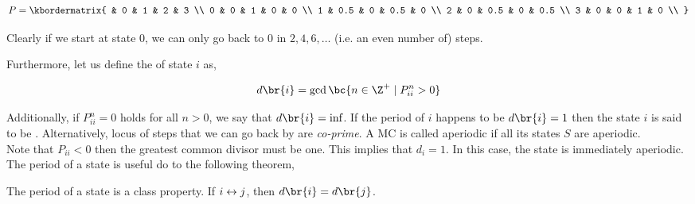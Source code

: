 \documentclass{article}
\begin{document}
\begin{example}
    \[ P = \kbordermatrix{
          & 0 & 1 & 2 & 3 \\
        0 & 0 & 1 & 0 & 0 \\
        1 & 0.5 & 0 & 0.5 & 0 \\
        2 & 0 & 0.5 & 0 & 0.5 \\
        3 & 0 & 0 & 1 & 0 \\
    } \]
    \begin{center}
    \end{center}
    Clearly if we start at state $0$, we can only go back to $0$ in $2,4,6,\ldots$ (i.e. an even number of) steps.
\end{example}
Furthermore, let us define the  of state $i$ as,

\[ d\br{i} = \gcd \bc{n \in \Z^{+} \mid P_{ii}^{n} > 0} \]

Additionally, if $P_{ii}^{n} = 0$ holds for all $n > 0$, we say that $d\br{i} = \inf$. If the period of $i$ happens to be $d\br{i} = 1$ then the state $i$ is said to be . Alternatively, locus of steps that we can go back by are \textit{co-prime}. A MC is called aperiodic if all its states $S$ are aperiodic.\\

Note that $P_{ii} < 0$ then the greatest common divisor must be one. This implies that $d_i = 1$. In this case, the state is immediately aperiodic.\\

The period of a state is useful do to the following theorem,

\begin{theorem}
\label{thm:period_class_prop}
The period of a state is a class property. If ${i}\leftrightarrow{j}$, then $d\br{i} = d\br{j}$.
\end{theorem}
\end{document}
